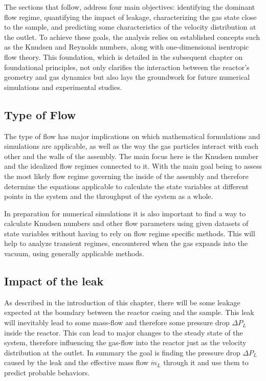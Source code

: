 	The sections that follow, address four main objectives: identifying the dominant flow regime, quantifying the impact of leakage, characterizing the gas state close to the sample, and predicting some characteristics of the velocity distribution at the outlet.
	To achieve these goals, the analysis relies on established concepts such as the Knudsen and Reynolds numbers, along with one-dimensional isentropic flow theory.
	This foundation, which is detailed in the subsequent chapter on foundational principles, not only clarifies the interaction between the reactor’s geometry and gas dynamics but also lays the groundwork for future numerical simulations and experimental studies.	
\subsection{Type of Flow}
	The type of flow has major implications on which mathematical formulations and simulations are applicable, as well as the way the gas particles interact with each other and the walls of the assembly. 
	The main focus here is the Knudsen number and the idealized flow regimes connected to it.
	With the main goal being to assess the most likely flow regime governing the inside of the assembly and therefore determine the equations applicable to calculate the state variables at different points in the system and the throughput of the system as a whole.

	In preparation for numerical simulations it is also important to find a way to calculate Knudsen numbers and other flow parameters using given datasets of state variables without having to rely on flow regime specific methods. This will help to analyze transient regimes, encountered when the gas expands into the vacuum, using generally applicable methods.

\subsection{Impact of the leak}
	As described in the introduction of this chapter, there will be some leakage expected at the boundary between the reactor casing and the sample.
	This leak will inevitably lead to some mass-flow and therefore some pressure drop $\Delta P_L$ inside the reactor.
	This can lead to major changes to the steady state of the system, therefore influencing the gas-flow into the reactor just as the velocity distribution at the outlet.
	In summary the goal is finding the pressure drop $\Delta P_L$ caused by the leak and the effective mass flow $\dot{m}_L$ through it and use them to predict probable behaviors.

